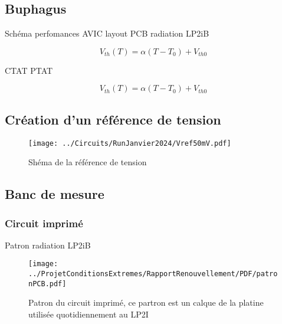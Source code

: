 \subsection{Buphagus}
\begin{metsUneSource}
Schéma
perfomances
AVIC
layout
PCB
radiation LP2iB

\begin{metsUneSource}
    \begin{equation}
        V_{th}(T) = \alpha(T - T_0) + V_{th0}
        \label{VtEnFonctionDeT}
    \end{equation}

CTAT PTAT

\end{metsUneSource}
\begin{equation}
    V_{th}(T) = \alpha(T - T_0) + V_{th0}
    \label{VtEnFonctionDeT}
\end{equation}


\end{metsUneSource}

\subsection{Création d'un référence de tension}


\begin{figure}
    \centering
    \texttt{[image: ../Circuits/RunJanvier2024/Vref50mV.pdf]}
    \caption{Shéma de la référence de tension}
    \label{fig:schBuphagus}
\end{figure}




\subsection{Banc de mesure}



\subsubsection{Circuit imprimé}

Patron radiation LP2iB
\begin{figure}
    \centering
    \texttt{[image: ../ProjetConditionsExtremes/RapportRenouvellement/PDF/patronPCB.pdf]}
    \caption{Patron du circuit imprimé, ce partron est un calque de la platine utilisée quotidiennement au LP2I}
    \label{fig:patron_PCB_Buphagus}
\end{figure}

